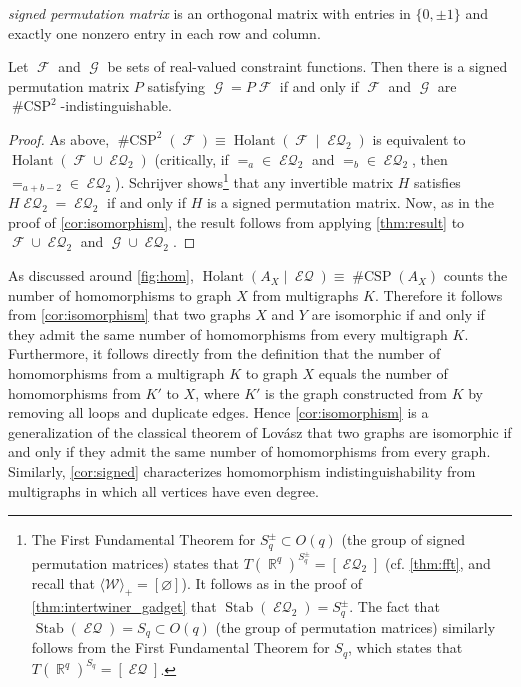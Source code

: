 \documentclass{article}
\DeclareMathOperator{\rr}{\mathbb{R}}
\DeclareMathOperator{\fc}{\mathcal{F}}
\DeclareMathOperator{\gc}{\mathcal{G}}
\DeclareMathOperator{\stab}{Stab}
\DeclareMathOperator{\holant}{Holant}
\DeclareMathOperator{\csp}{\#CSP}
\DeclareMathOperator{\eq}{\mathcal{EQ}}
\begin{document}
\emph{signed permutation matrix} is an orthogonal matrix with entries
in $\{0,\pm 1\}$ and exactly one nonzero entry in each row and column.
\begin{corollary}\label{cor:signed}
    Let $\fc$ and $\gc$ be sets of real-valued constraint functions.
    Then there is a signed permutation matrix $P$ satisfying $\gc = P\fc$ if and only if
    $\fc$ and $\gc$ are $\csp^2$-indistinguishable.
\end{corollary}
\begin{proof}
    As above, $\csp^2(\fc) \equiv \holant(\fc \mid \eq_2)$ is equivalent to
    $\holant(\fc \cup \eq_2)$
    (critically, if $=_a \in \eq_2$ and $=_b \in \eq_2$, then $=_{a+b-2} \in \eq_2$). 
    Schrijver \cite{schrijver_tensor_2008} 
    shows\footnote{The First Fundamental Theorem for $S_q^{\pm} \subset O(q)$ (the group of signed
        permutation matrices) states that $T(\rr^q)^{S_q^{\pm}} = [\eq_2]$
        (cf. \autoref{thm:fft}, and recall that $\langle \mathcal{W} \rangle_+ = [\varnothing]$).
        It follows as in the proof of \autoref{thm:intertwiner_gadget} that $\stab(\eq_2) = S_q^{\pm}$.
        The fact that $\stab(\eq) = S_q \subset O(q)$ (the group of permutation matrices) similarly follows
        from the First Fundamental Theorem for $S_q$, which states that
        $T(\rr^q)^{S_q} = [\eq]$.
    }
    that any invertible matrix $H$ satisfies $H\eq_2 = \eq_2$ if and only if $H$ is a signed 
    permutation matrix. 
    Now, as in the proof of \autoref{cor:isomorphism}, the result follows from applying
    \autoref{thm:result} to $\fc \cup \eq_2$ and $\gc \cup \eq_2$.
\end{proof}
As discussed around \autoref{fig:hom}, $\holant(A_X \mid \eq) \equiv \csp(A_X)$ counts the 
number of homomorphisms to graph $X$ from multigraphs $K$. Therefore it follows from
\autoref{cor:isomorphism} that two graphs $X$ and $Y$ are isomorphic if and only if they
admit the same number of homomorphisms from every multigraph $K$. Furthermore, it follows 
directly from the definition that the number of homomorphisms from a multigraph $K$ to graph 
$X$ equals the number of homomorphisms 
from $K'$ to $X$, where $K'$ is the graph constructed from $K$ by
removing all loops and duplicate edges. Hence \autoref{cor:isomorphism}
is a generalization of the classical theorem of Lovász 
\cite{lovasz_operations} that two graphs are isomorphic if and only if they admit the same 
number of homomorphisms from every graph. Similarly, \autoref{cor:signed} characterizes
homomorphism indistinguishability from multigraphs in which all vertices have even degree.
\end{document}
